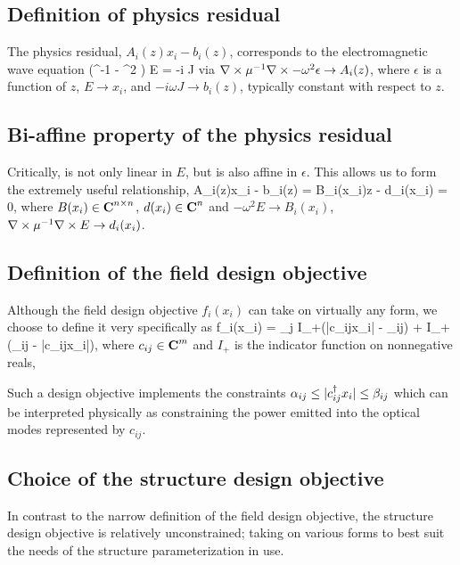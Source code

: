 \documentclass{book}
\begin{document}
\subsection{Definition of physics residual}
The physics residual, $A_i(z)x_i - b_i(z)$, 
    corresponds to the electromagnetic wave equation
        {(\curl \mu^{-1} \curl - \omega^2 \epsilon) E = -i \omega J}
        via
    \BI $\nabla\times \mu^{-1} \nabla\times - \omega^2 \epsilon \to A_i(z)$, where $\epsilon$ is a function of $z$,
    \I  $E \to x_i$, and
    \I  $-i \omega J \to b_i(z)$, typically constant with respect to $z$. \EI

\subsection{Bi-affine property of the physics residual}
Critically,  is not only linear in $E$,
    but is also affine in $\epsilon$.
This allows us to form the extremely useful relationship,
        {A_i(z)x_i - b_i(z) = B_i(x_i)z - d_i(x_i) = 0,}
    where $B(x_i) \in {\mbox{\bf C}}^{n \times n}$, $d(x_i) \in {\mbox{\bf C}}^n$ and
    \BI $-\omega^2 E \to B_i(x_i)$, 
    \I  $\nabla\times \mu^{-1} \nabla\times E \to d_i(x_i)$. \EI

\subsection{Definition of the field design objective}
Although the field design objective $f_i(x_i)$ 
    can take on virtually any form,
    we choose to define it very specifically as
        {f_i(x_i) = \sum_j I_+(|c_{ij}\T x_i| - \alpha_{ij})
            + I_+(\beta_{ij} - |c_{ij}\T x_i|),}
    where $c_{ij} \in {\mbox{\bf C}}^m$ and 
    $I_+$ is the indicator function on nonnegative reals,

Such a design objective implements the constraints 
    $\alpha_{ij} \le |c_{ij}^\dagger x_i| \le \beta_{ij}$
    which can be interpreted physically as 
    constraining the power emitted into the optical modes
    represented by $c_{ij}$.

\subsection{Choice of the structure design objective}
In contrast to the narrow definition of the field design objective,
    the structure design objective is relatively unconstrained;
    taking on various forms to best suit the needs of
    the structure parameterization in use.
\end{document}
